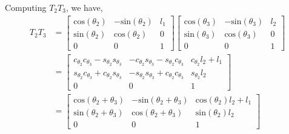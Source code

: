 \documentclass[11pt]{article}
\begin{document}
\begin{enumerate}[leftmargin=0.3in]
\begin{enumerate}
            Computing $\mathit{T}_2 \mathit{T}_3$, we have,
            \begin{align*}
                \mathit{T}_2 \mathit{T}_3 &= \begin{bmatrix}
                   \text{cos}(\theta_2) & -\text{sin}(\theta_2) & \mathit{l}_1 \\
                   \text{sin}(\theta_2) & \text{cos}(\theta_2) & 0 \\
                   0 & 0 & 1
                   \end{bmatrix} \begin{bmatrix}
                   \text{cos}(\theta_3) & -\text{sin}(\theta_3) & \mathit{l}_2 \\
                   \text{sin}(\theta_3) & \text{cos}(\theta_3) & 0 \\
                   0 & 0 & 1
               \end{bmatrix} \\
                  &= \begin{bmatrix}
                      c_{\theta_2} c_{\theta_3} - s_{\theta_2} s_{\theta_3} & -c_{\theta_2} s_{\theta_3} - s_{\theta_2} c_{\theta_3} & c_{\theta_2} \mathit{l}_2 + \mathit{l}_1 \\
                      s_{\theta_2} c_{\theta_3} + c_{\theta_2} s_{\theta_3} & -s_{\theta_2} s_{\theta_3} + c_{\theta_2} c_{\theta_3} & s_{\theta_2} \mathit{l}_2 \\
                      0 & 0 & 1
                  \end{bmatrix} \\
                  &= \begin{bmatrix}
                      \text{cos}(\theta_2 + \theta_3) & -\text{sin}(\theta_2 + \theta_3) & \text{cos}(\theta_2)\mathit{l}_2 + \mathit{l}_1 \\
                      \text{sin}(\theta_2 + \theta_3) & \text{cos}(\theta_2 + \theta_3) & \text{sin}(\theta_2) \mathit{l}_2 \\
                      0 & 0 & 1
                  \end{bmatrix}
            \end{align*}


\end{enumerate}
\end{enumerate}
\end{document}
